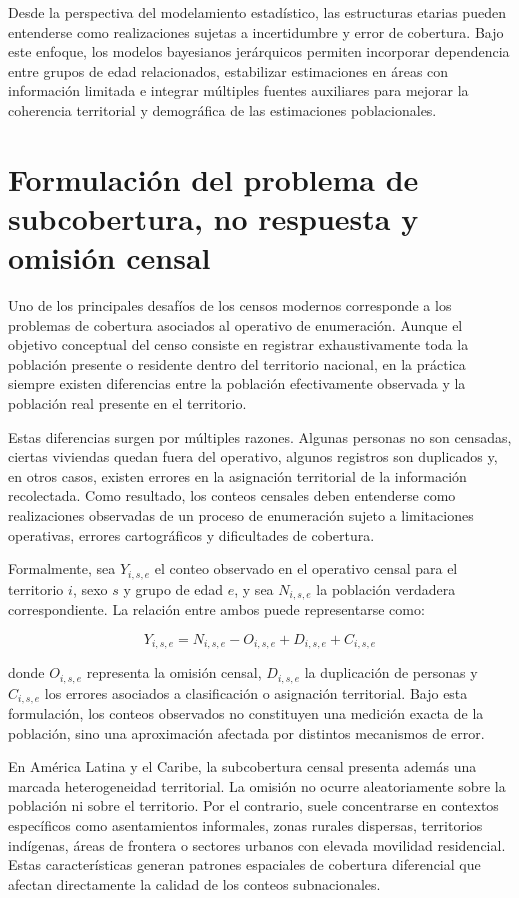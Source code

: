 \documentclass[
  spanish,
]{book}
\begin{document}
Desde la perspectiva del modelamiento estadístico, las estructuras etarias pueden entenderse como realizaciones sujetas a incertidumbre y error de cobertura. Bajo este enfoque, los modelos bayesianos jerárquicos permiten incorporar dependencia entre grupos de edad relacionados, estabilizar estimaciones en áreas con información limitada e integrar múltiples fuentes auxiliares para mejorar la coherencia territorial y demográfica de las estimaciones poblacionales.

\section{Formulación del problema de subcobertura, no respuesta y omisión censal}\label{formulaciuxf3n-del-problema-de-subcobertura-no-respuesta-y-omisiuxf3n-censal}

Uno de los principales desafíos de los censos modernos corresponde a los problemas de cobertura asociados al operativo de enumeración. Aunque el objetivo conceptual del censo consiste en registrar exhaustivamente toda la población presente o residente dentro del territorio nacional, en la práctica siempre existen diferencias entre la población efectivamente observada y la población real presente en el territorio.

Estas diferencias surgen por múltiples razones. Algunas personas no son censadas, ciertas viviendas quedan fuera del operativo, algunos registros son duplicados y, en otros casos, existen errores en la asignación territorial de la información recolectada. Como resultado, los conteos censales deben entenderse como realizaciones observadas de un proceso de enumeración sujeto a limitaciones operativas, errores cartográficos y dificultades de cobertura.

Formalmente, sea \(Y_{i,s,e}\) el conteo observado en el operativo censal para el territorio \(i\), sexo \(s\) y grupo de edad \(e\), y sea \(N_{i,s,e}\) la población verdadera correspondiente. La relación entre ambos puede representarse como:

\[
Y_{i,s,e} = N_{i,s,e} - O_{i,s,e} + D_{i,s,e} + C_{i,s,e}
\]

donde \(O_{i,s,e}\) representa la omisión censal, \(D_{i,s,e}\) la duplicación de personas y \(C_{i,s,e}\) los errores asociados a clasificación o asignación territorial. Bajo esta formulación, los conteos observados no constituyen una medición exacta de la población, sino una aproximación afectada por distintos mecanismos de error.

En América Latina y el Caribe, la subcobertura censal presenta además una marcada heterogeneidad territorial. La omisión no ocurre aleatoriamente sobre la población ni sobre el territorio. Por el contrario, suele concentrarse en contextos específicos como asentamientos informales, zonas rurales dispersas, territorios indígenas, áreas de frontera o sectores urbanos con elevada movilidad residencial. Estas características generan patrones espaciales de cobertura diferencial que afectan directamente la calidad de los conteos subnacionales.
\end{document}
